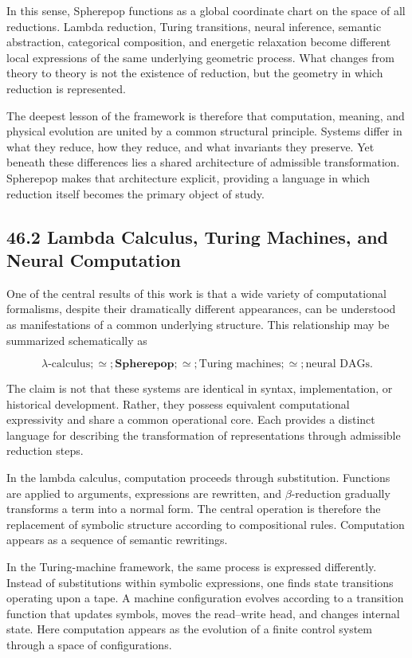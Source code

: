 \documentclass[12pt,letterpaper]{article}
\theoremstyle{remark}
\begin{document}
In this sense, Spherepop functions as a global coordinate chart on the space of all reductions. Lambda reduction, Turing transitions, neural inference, semantic abstraction, categorical composition, and energetic relaxation become different local expressions of the same underlying geometric process. What changes from theory to theory is not the existence of reduction, but the geometry in which reduction is represented.

The deepest lesson of the framework is therefore that computation, meaning, and physical evolution are united by a common structural principle. Systems differ in what they reduce, how they reduce, and what invariants they preserve. Yet beneath these differences lies a shared architecture of admissible transformation. Spherepop makes that architecture explicit, providing a language in which reduction itself becomes the primary object of study.

\subsection{46.2 Lambda Calculus, Turing Machines, and Neural Computation}

One of the central results of this work is that a wide variety of computational formalisms, despite their dramatically different appearances, can be understood as manifestations of a common underlying structure. This relationship may be summarized schematically as

\[
\lambda\text{-calculus}
;\simeq;
\mathbf{Spherepop}
;\simeq;
\text{Turing machines}
;\simeq;
\text{neural DAGs}.
\]

The claim is not that these systems are identical in syntax, implementation, or historical development. Rather, they possess equivalent computational expressivity and share a common operational core. Each provides a distinct language for describing the transformation of representations through admissible reduction steps.

In the lambda calculus, computation proceeds through substitution. Functions are applied to arguments, expressions are rewritten, and $\beta$-reduction gradually transforms a term into a normal form. The central operation is therefore the replacement of symbolic structure according to compositional rules. Computation appears as a sequence of semantic rewritings.

In the Turing-machine framework, the same process is expressed differently. Instead of substitutions within symbolic expressions, one finds state transitions operating upon a tape. A machine configuration evolves according to a transition function that updates symbols, moves the read--write head, and changes internal state. Here computation appears as the evolution of a finite control system through a space of configurations.
\end{document}
